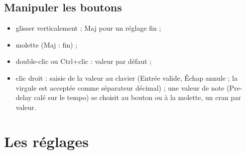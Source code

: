 \documentclass[a4paper,11pt]{article}
\begin{document}
\subsection{Manipuler les boutons}
\begin{itemize}
\item glisser verticalement ; \textsf{Maj} pour un réglage fin ;
\item molette (\textsf{Maj} : fin) ;
\item double-clic ou \textsf{Ctrl}+clic : valeur par défaut ;
\item clic droit : saisie de la valeur au clavier (\textsf{Entrée} valide, \textsf{Échap}
  annule ; la virgule est acceptée comme séparateur décimal) ; une valeur de note (Pre-delay
  calé sur le tempo) se choisit au bouton ou à la molette, un cran par valeur.
\end{itemize}

\section{Les réglages}\label{sec:reglages}
\end{document}
